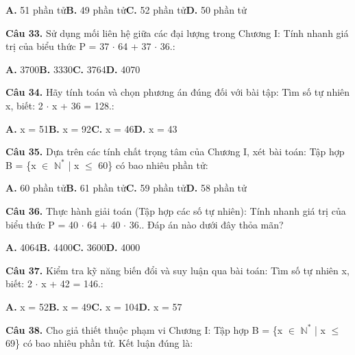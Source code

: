 \documentclass[11pt,a4paper]{article}
\begin{document}
\hspace*{1.5em}\textbf{A.} 51 phần tử\quad\quad \textbf{B.} 49 phần tử\quad\quad \textbf{C.} 52 phần tử\quad\quad \textbf{D.} 50 phần tử\par\vspace{2pt}
\textbf{\color{primary} Câu 33.} Sử dụng mối liên hệ giữa các đại lượng trong Chương I: Tính nhanh giá trị của biểu thức P = 37 $\cdot$ 64 + 37 $\cdot$ 36.:\par
\hspace*{1.5em}\textbf{A.} 3700\quad\quad \textbf{B.} 3330\quad\quad \textbf{C.} 3764\quad\quad \textbf{D.} 4070\par\vspace{2pt}
\textbf{\color{primary} Câu 34.} Hãy tính toán và chọn phương án đúng đối với bài tập: Tìm số tự nhiên x, biết: 2 $\cdot$ x + 36 = 128.:\par
\hspace*{1.5em}\textbf{A.} x = 51\quad\quad \textbf{B.} x = 92\quad\quad \textbf{C.} x = 46\quad\quad \textbf{D.} x = 43\par\vspace{2pt}
\textbf{\color{primary} Câu 35.} Dựa trên các tính chất trọng tâm của Chương I, xét bài toán: Tập hợp B = \{x $\in$ $\mathbb{N}^*$ | x $\le$ 60\} có bao nhiêu phần tử:\par
\hspace*{1.5em}\textbf{A.} 60 phần tử\quad\quad \textbf{B.} 61 phần tử\quad\quad \textbf{C.} 59 phần tử\quad\quad \textbf{D.} 58 phần tử\par\vspace{2pt}
\textbf{\color{primary} Câu 36.} Thực hành giải toán (Tập hợp các số tự nhiên): Tính nhanh giá trị của biểu thức P = 40 $\cdot$ 64 + 40 $\cdot$ 36.. Đáp án nào dưới đây thỏa mãn?\par
\hspace*{1.5em}\textbf{A.} 4064\quad\quad \textbf{B.} 4400\quad\quad \textbf{C.} 3600\quad\quad \textbf{D.} 4000\par\vspace{2pt}
\textbf{\color{primary} Câu 37.} Kiểm tra kỹ năng biến đổi và suy luận qua bài toán: Tìm số tự nhiên x, biết: 2 $\cdot$ x + 42 = 146.:\par
\hspace*{1.5em}\textbf{A.} x = 52\quad\quad \textbf{B.} x = 49\quad\quad \textbf{C.} x = 104\quad\quad \textbf{D.} x = 57\par\vspace{2pt}
\textbf{\color{primary} Câu 38.} Cho giả thiết thuộc phạm vi Chương I: Tập hợp B = \{x $\in$ $\mathbb{N}^*$ | x $\le$ 69\} có bao nhiêu phần tử. Kết luận đúng là:\par
\end{document}
